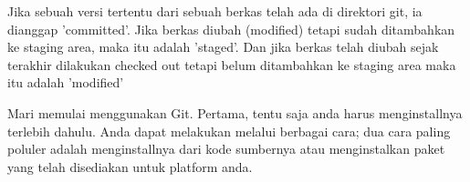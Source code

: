 \noindent 
{\fontsize{14pt}{14pt}\selectfont Jika sebuah versi tertentu dari sebuah berkas telah ada di direktori git, ia dianggap 'committed'. Jika berkas diubah (modified) tetapi sudah ditambahkan ke staging area, maka itu adalah 'staged'. Dan jika berkas telah diubah sejak terakhir dilakukan checked out tetapi belum ditambahkan ke staging area maka itu adalah 'modified' \\} \par
\vspace{14pt}
\vspace{14pt}
\noindent 
{\fontsize{14pt}{14pt}\selectfont Mari memulai menggunakan Git. Pertama, tentu saja anda harus menginstallnya terlebih dahulu. Anda dapat melakukan melalui berbagai cara; dua cara paling poluler adalah menginstallnya dari kode sumbernya atau menginstalkan paket yang telah disediakan untuk platform anda. \\} \par

